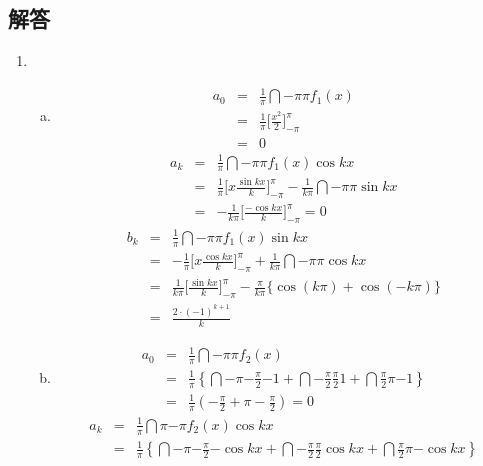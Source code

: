 \documentclass[dvipdfmx,titlepage, 11pt, a4paper]{jsarticle}%
\begin{document}
\subsection{解答}
\begin{enumerate}[(1)]
  \item \begin{enumerate}[(a)]
    \item 
    \begin{eqnarray*}
      a_0 &=&\frac{1}{\pi}\dint{-\pi}{\pi}{f_1(x)}\\
      &=& \frac{1}{\pi}\biggl[\frac{x^2}{2}\biggr]_{-\pi}^{\pi}\\
      &=& 0
    \end{eqnarray*}
    \begin{eqnarray*}
      a_k &=&\frac{1}{\pi}\dint{-\pi}{\pi}{f_1(x)\cos kx}\\
      &=&\frac{1}{\pi}\biggl[x\frac{\sin kx}{k}\biggr]_{-\pi}^{\pi} - \frac{1}{k\pi}\dint{-\pi}{\pi}{\sin kx}\\
      &=&-\frac{1}{k\pi}\biggl[\frac{-\cos kx}{k}\biggr]_{-\pi}^{\pi} = 0
    \end{eqnarray*}
    \begin{eqnarray*}
      b_k &=&\frac{1}{\pi}\dint{-\pi}{\pi}{f_1(x)\sin kx}\\
      &=&-\frac{1}{\pi}\biggl[x\frac{\cos kx}{k}\biggr]_{-\pi}^{\pi} + \frac{1}{k\pi}\dint{-\pi}{\pi}{\cos kx}\\
      &=&\frac{1}{k\pi}\biggl[\frac{\sin kx}{k}\biggr]_{-\pi}^{\pi} - \frac{\pi}{k\pi}\{\cos(k\pi) + \cos(-k\pi)\}\\
      &=&\frac{2\cdot (-1)^{k + 1}}{k}
    \end{eqnarray*}
    \item 
    \begin{eqnarray*}
      a_0 &=&\frac{1}{\pi}\dint{-\pi}{\pi}{f_2(x)}\\
      &=& \frac{1}{\pi}\left\{\dint{-\pi}{-\frac{\pi}{2}}{-1} + \dint{-\frac{\pi}{2}}{\frac{\pi}{2}}{1} + 
      \dint{\frac{\pi}{2}}{\pi}{-1}\right\}\\
      &=& \frac{1}{\pi}\left(-\frac{\pi}{2} + \pi - \frac{\pi}{2}\right) = 0
    \end{eqnarray*}
    \begin{eqnarray*}
      a_k &=&\frac{1}{\pi}\dint{\pi}{-\pi}{f_2(x)\cos kx}\\
      &=& \frac{1}{\pi}\left\{\dint{-\pi}{-\frac{\pi}{2}}{-\cos kx} + \dint{-\frac{\pi}{2}}{\frac{\pi}{2}}{\cos kx} + 
      \dint{\frac{\pi}{2}}{\pi}{-\cos kx}\right\}\\

\end{eqnarray*}
\end{enumerate}
\end{enumerate}
\end{document}
